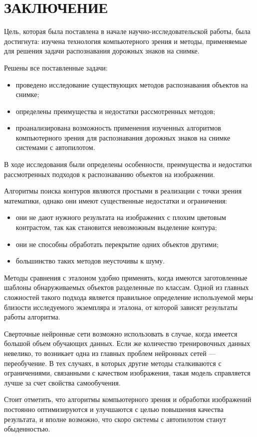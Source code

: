 \chapter*{ЗАКЛЮЧЕНИЕ}

Цель, которая была поставлена в начале научно-исследовательской работы, была достигнута: изучена технология компьютерного зрения и методы, применяемые для решения задачи распознавания дорожных знаков на снимке.

Решены все поставленные задачи:

\begin{itemize}[label=---]
	\item проведено исследование существующих методов распознавания объектов на снимке;
	\item определены преимущества и недостатки рассмотренных методов;
    \item проанализирована возможность применения изученных алгоритмов компьютерного зрения для распознавания дорожных знаков на снимке системами с автопилотом.
\end{itemize}

В ходе исследования были определены особенности, преимущества и недостатки рассмотренных подходов к распознаванию объектов на изображении.

Алгоритмы поиска контуров являются простыми в реализации с точки зрения математики, однако они имеют существенные недостатки и ограничения:
\begin{itemize}[label=---]
	\item они не дают нужного результата на изображених с плохим цветовым контрастом, так как становится невозможным выделение контура;
	\item они не способны обработать перекрытие одних объектов другими;
    \item большинство таких методов неусточивы к шуму.
\end{itemize}

Методы сравнения с эталоном удобно применять, когда имеются заготовленные шаблоны обнаруживаемых объектов разделенные по классам. Одной из главных сложностей такого подхода является правильное определение используемой меры близости исследуемого экземпляра и эталона, от которой зависят результаты работы алгоритма.

Сверточные нейронные сети возможно использовать в случае, когда имеется большой объем обучающих данных. Если же количество тренировочных данных невелико, то возникает одна из главных проблем нейронных сетей --- переобучение. В тех случаях, в которых другие методы сталкиваются с ограничениями, связанными с качеством изображения, такая модель справляется лучше за счет свойства самообучения.

Стоит отметить, что алгоритмы компьютерного зрения и обработки изображений постоянно оптимизируются и улучшаются с целью повышения качества результата, и вполне возможно, что скоро системы с автопилотом станут обыденностью.